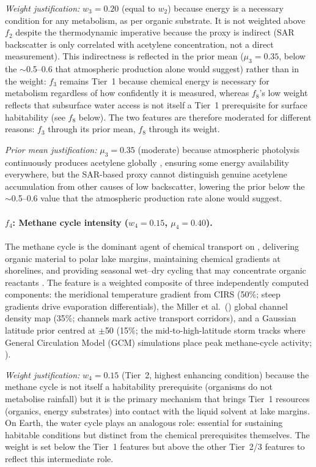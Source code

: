 \textit{Weight justification:} $w_3 = 0.20$ (equal to $w_2$) because energy is a necessary condition for any metabolism, as per organic substrate.  It is not weighted above $f_2$ despite the thermodynamic imperative because the proxy is indirect (SAR backscatter is only correlated with acetylene concentration, not a direct measurement).  This indirectness is reflected in the prior mean ($\mu_3 = 0.35$, below the $\sim$0.5--0.6 that atmospheric production alone would suggest) rather than in the weight: $f_3$ remains Tier~1 because chemical energy is necessary for metabolism regardless of how confidently it is measured, whereas $f_8$'s low weight reflects that subsurface water access is not itself a Tier~1 prerequisite for surface habitability (see $f_8$ below).  The two features are therefore moderated for different reasons: $f_3$ through its prior mean, $f_8$ through its weight.

\textit{Prior mean justification:} $\mu_3 = 0.35$ (moderate) because atmospheric photolysis continuously produces acetylene globally \citep{WilsonAtreya2004,Lavvas2008}, ensuring some energy availability everywhere, but the SAR-based proxy cannot distinguish genuine acetylene accumulation from other causes of low backscatter, lowering the prior below the $\sim$0.5--0.6 value that the atmospheric production rate alone would suggest.

\paragraph{$f_4$: Methane cycle intensity ($w_4 = 0.15$, $\mu_4 = 0.40$).}
The methane cycle is the dominant agent of chemical transport on \titan{}, delivering organic material to polar lake margins, maintaining chemical gradients at shorelines, and providing seasonal wet--dry cycling that may concentrate organic reactants \citep{MitchellLora2016,Turtle2011}.  The feature is a weighted composite of three independently computed components: the meridional temperature gradient from CIRS \citep{Jennings2019} (50\%; steep gradients drive evaporation differentials), the Miller et al.\ (\citeyear{Miller2021channels}) global channel density map (35\%; channels mark active transport corridors), and a Gaussian latitude prior centred at $\pm$50\textdegree{} (15\%; the mid-to-high-latitude storm tracks where General Circulation Model (GCM) simulations place peak methane-cycle activity; \citealt{MitchellLora2016}).

\textit{Weight justification:} $w_4 = 0.15$ (Tier~2, highest enhancing condition) because the methane cycle is not itself a habitability prerequisite (organisms do not metabolise rainfall) but it is the primary mechanism that brings Tier~1 resources (organics, energy substrates) into contact with the liquid solvent at lake margins.  On Earth, the water cycle plays an analogous role: essential for sustaining habitable conditions but distinct from the chemical prerequisites themselves.  The weight is set below the Tier~1 features but above the other Tier~2/3 features to reflect this intermediate role.

